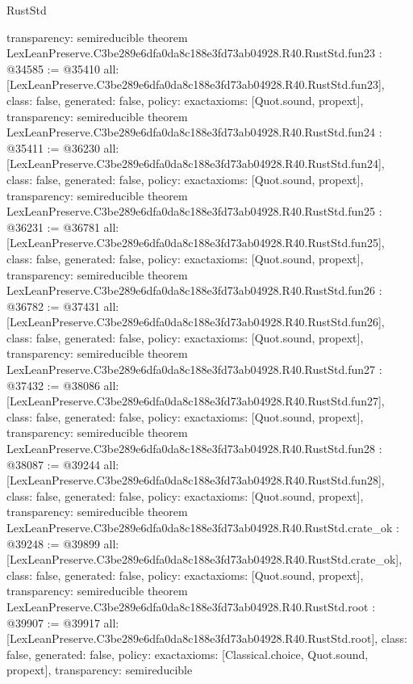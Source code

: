 \begin{lexlean}{RustStd}
\begin{coremodule}
{  transparency: semireducible
}
theorem LexLeanPreserve.C3be289e6dfa0da8c188e3fd73ab04928.R40.RustStd.fun23 : @34585 := @35410 {
  all: [LexLeanPreserve.C3be289e6dfa0da8c188e3fd73ab04928.R40.RustStd.fun23],
  class: false,
  generated: false,
  policy: exact{axioms: [Quot.sound, propext]},
  transparency: semireducible
}
theorem LexLeanPreserve.C3be289e6dfa0da8c188e3fd73ab04928.R40.RustStd.fun24 : @35411 := @36230 {
  all: [LexLeanPreserve.C3be289e6dfa0da8c188e3fd73ab04928.R40.RustStd.fun24],
  class: false,
  generated: false,
  policy: exact{axioms: [Quot.sound, propext]},
  transparency: semireducible
}
theorem LexLeanPreserve.C3be289e6dfa0da8c188e3fd73ab04928.R40.RustStd.fun25 : @36231 := @36781 {
  all: [LexLeanPreserve.C3be289e6dfa0da8c188e3fd73ab04928.R40.RustStd.fun25],
  class: false,
  generated: false,
  policy: exact{axioms: [Quot.sound, propext]},
  transparency: semireducible
}
theorem LexLeanPreserve.C3be289e6dfa0da8c188e3fd73ab04928.R40.RustStd.fun26 : @36782 := @37431 {
  all: [LexLeanPreserve.C3be289e6dfa0da8c188e3fd73ab04928.R40.RustStd.fun26],
  class: false,
  generated: false,
  policy: exact{axioms: [Quot.sound, propext]},
  transparency: semireducible
}
theorem LexLeanPreserve.C3be289e6dfa0da8c188e3fd73ab04928.R40.RustStd.fun27 : @37432 := @38086 {
  all: [LexLeanPreserve.C3be289e6dfa0da8c188e3fd73ab04928.R40.RustStd.fun27],
  class: false,
  generated: false,
  policy: exact{axioms: [Quot.sound, propext]},
  transparency: semireducible
}
theorem LexLeanPreserve.C3be289e6dfa0da8c188e3fd73ab04928.R40.RustStd.fun28 : @38087 := @39244 {
  all: [LexLeanPreserve.C3be289e6dfa0da8c188e3fd73ab04928.R40.RustStd.fun28],
  class: false,
  generated: false,
  policy: exact{axioms: [Quot.sound, propext]},
  transparency: semireducible
}
theorem LexLeanPreserve.C3be289e6dfa0da8c188e3fd73ab04928.R40.RustStd.crate_ok : @39248 := @39899 {
  all: [LexLeanPreserve.C3be289e6dfa0da8c188e3fd73ab04928.R40.RustStd.crate_ok],
  class: false,
  generated: false,
  policy: exact{axioms: [Quot.sound, propext]},
  transparency: semireducible
}
theorem LexLeanPreserve.C3be289e6dfa0da8c188e3fd73ab04928.R40.RustStd.root : @39907 := @39917 {
  all: [LexLeanPreserve.C3be289e6dfa0da8c188e3fd73ab04928.R40.RustStd.root],
  class: false,
  generated: false,
  policy: exact{axioms: [Classical.choice, Quot.sound, propext]},
  transparency: semireducible
}


\end{coremodule}
\end{lexlean}
